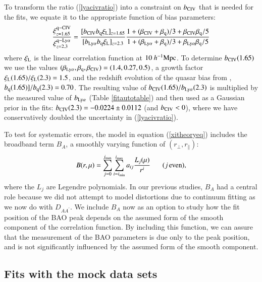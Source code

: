\documentclass{aa}
\newcommand{\imin}{i_{\rm min}}
\newcommand{\imax}{i_{\rm max}}
\newcommand{\jmax}{j_{\rm max}}
\newcommand{\hMpc}{h^{-1}{\rm Mpc}}
\newcommand{\rperp}{r_\perp}
\newcommand{\rpar}{r_\parallel}
\newcommand{\betalya}{\beta_{\rm Ly\alpha}}
\newcommand{\blya}{b_{\rm Ly\alpha}}
\newcommand{\betaciv}{\beta_{\rm CIV}}
\newcommand{\bciv}{b_{\rm CIV}}
\newcommand{\betaq}{\beta_{\rm q}}
\newcommand{\bqso}{b_{\rm q}}
\begin{document}
To transform the ratio  (\ref{lyacivratio}) into a
constraint on $\bciv$ that is needed for the fits, we equate 
it to the appropriate
function of bias parameters:
\begin{equation}
  \frac{\xi^{\rm q-CIV}_{z=1.65}}{\xi^{\rm q-Ly\alpha}_{z=2.3}} =
  \frac{[\bciv\bqso\xi_{\rm L}]_{z=1.65}}{[\blya\bqso\xi_{\rm L}]_{z=2.3}}
  \frac{1+(\betaciv+\betaq)/3 + \betaciv\betaq/5}
       {1+(\betalya+\betaq)/3 + \betalya\betaq/5}
\end{equation}
where $\xi_{\rm L}$ is the linear correlation function at $10~\hMpc$.
To determine $\bciv(1.65)$ we use the values
$(\betalya,\betaq,\betaciv)=(1.4,0.27,0.5)$,
a growth factor $\xi_{\rm L}(1.65)/\xi_{\rm L}(2.3)=1.5$,
and  the redshift evolution of the quasar
bias from \citet{2005MNRAS.356..415C}, $\bqso(1.65)]/\bqso(2.3)=0.70$.
The resulting value of $\bciv(1.65)/\blya(2.3)$
is multiplied by the measured value of $\blya$ (Table \ref{fitautotable})
and then used as a Gaussian prior in the fits:
$\bciv(2.3)=-0.0224\pm 0.0112$ (and $\bciv<0$), where we have conservatively
doubled the uncertainty in (\ref{lyacivratio}).




To test for systematic errors, the model in
equation (\ref{xitheoryeq})
includes the broadband term $B_A$, a smoothly varying function of
$(\rperp,\rpar)$:
\begin{equation}
B(r,\mu) =
\sum_{j=0}^{\jmax} \sum_{i=\imin}^{\imax} a_{ij} \frac{L_{j}(\mu)}{r^i}
\hspace*{5mm}\; (j\,\rm{even}) ,
\label{xibroadbandeq}
\end{equation}
where the $L_{j}$ are Legendre polynomials.
In our previous studies, $B_A$  had a central role because we did not
attempt to model distortions due to continuum fitting
as we now do with $D_{AA^\prime}$.
We include $B_A$ now as an option to study how the 
fit position of the BAO peak depends on the assumed
form of the smooth component of the correlation function.
By including this function, we can assure that the measurement of the BAO
parameters
is due only to the peak position, and is not significantly
influenced by the assumed form of the smooth component.






\subsection{Fits with the mock data sets}
\label{mockanalysissec}
\end{document}
